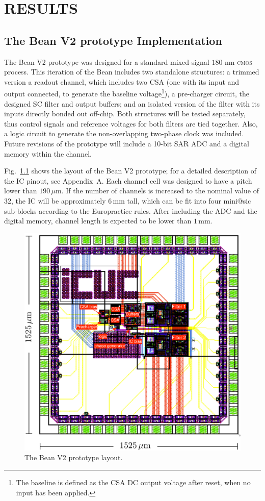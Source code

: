 \chapter{RESULTS}
\label{chapter:results}

\section{The Bean V2 prototype Implementation}
The Bean V2 prototype was designed for a standard mixed-signal $180\text{-nm}$ \textsc{cmos} process. This iteration of the Bean includes two standalone structures: a trimmed version a readout channel, which includes two CSA (one with its input and output connected, to generate the baseline voltage\footnote{The baseline is defined as the CSA DC output voltage after reset, when no input has been applied.}), a pre-charger circuit, the designed SC filter and output buffers; and an isolated version of the filter with its inputs directly bonded out off-chip.  Both structures will be tested separately, thus control signals and reference voltages for both filters are tied together. Also, a logic circuit to generate the non-overlapping two-phase clock was included. Future revisions of the prototype will include a 10-bit SAR ADC and a digital memory within the channel.

Fig.~\ref{fig:IC_layout} shows the layout of the Bean V2 prototype; for a detailed description of the IC pinout, see Appendix~A. Each channel cell was designed to have a pitch lower than $190\,\mu\text{m}$. If the number of channels is increased to the nominal value of $32$, the IC will be approximately $6\,\text{mm}$ tall, which can be fit into four mini@sic sub-blocks according to the Europractice rules. After including the ADC and the digital memory, channel length is expected to be lower than $1\,\text{mm}$.

\begin{figure}[!t]
	\centering
	\includegraphics[width=5in]{./Figures/IC_layout}
	\caption{The Bean V2 prototype layout.}\label{fig:IC_layout}
\end{figure}

